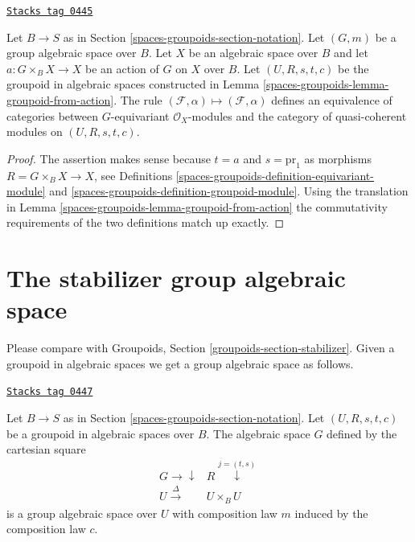 \begin{lemma}
\label{spaces-groupoids-lemma-action-groupoid-modules}
\href{https://stacks.math.columbia.edu/tag/0445}{\texttt{Stacks tag 0445}}

Let $B \to S$ as in Section \ref{spaces-groupoids-section-notation}.
Let $(G, m)$ be a group algebraic space over $B$.
Let $X$ be an algebraic space over $B$ and let $a : G \times_B X \to X$
be an action of $G$ on $X$ over $B$. Let $(U, R, s, t, c)$ be
the groupoid in algebraic spaces constructed in
Lemma \ref{spaces-groupoids-lemma-groupoid-from-action}.
The rule
$(\mathcal{F}, \alpha) \mapsto (\mathcal{F}, \alpha)$ defines
an equivalence of categories between $G$-equivariant
$\mathcal{O}_X$-modules and the category of quasi-coherent
modules on $(U, R, s, t, c)$.
\end{lemma}

\begin{proof}
The assertion makes sense because $t = a$ and $s = \text{pr}_1$
as morphisms $R = G \times_B X \to X$, see
Definitions \ref{spaces-groupoids-definition-equivariant-module} and
\ref{spaces-groupoids-definition-groupoid-module}.
Using the translation in Lemma \ref{spaces-groupoids-lemma-groupoid-from-action}
the commutativity requirements
of the two definitions match up exactly.
\end{proof}

\section{The stabilizer group algebraic space}
\label{spaces-groupoids-section-stabilizer}
Please compare with
Groupoids, Section \ref{groupoids-section-stabilizer}.
Given a groupoid in algebraic spaces we get a group algebraic space as follows.

\begin{lemma}
\label{spaces-groupoids-lemma-groupoid-stabilizer}
\href{https://stacks.math.columbia.edu/tag/0447}{\texttt{Stacks tag 0447}}

Let $B \to S$ as in Section \ref{spaces-groupoids-section-notation}.
Let $(U, R, s, t, c)$ be a groupoid in algebraic spaces over $B$.
The algebraic space $G$ defined by the cartesian square
$$
\begin{array}{cc}G \longrightarrow\downarrow & R \overset{j = (t, s)}{\downarrow} \\ U \overset{\Delta}{\longrightarrow} & U \times_B U\end{array}
$$
is a group algebraic space over $U$ with composition law
$m$ induced by the composition law $c$.
\end{lemma}

